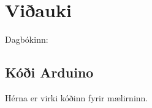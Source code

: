 \section{Viðauki}
Dagbókinn: 
\begingroup
\obeylines

\endgroup
\subsection{Kóði Arduino}
Hérna er virki kóðinn fyrir mælirninn.
\begingroup

\endgroup